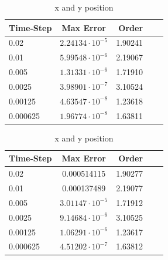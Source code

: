 \documentclass[12pt]{article}
\begin{document}
\begin{table}[bht]
\begin{center}
\begin{tabular}{|l|c|r|c|c|}
\hline
Time-Step& Max Error & Order \\ \hline
0.02&$2.24134\cdot10^{-5}$& 1.90241\\ \hline
0.01& $5.99548\cdot10^{-6}$& 2.19067 \\ \hline
0.005& $1.31331\cdot10^{-6}$& 1.71910\\ \hline
0.0025& $3.98901\cdot10^{-7}$& 3.10524 \\ \hline
0.00125&$4.63547\cdot10^{-8}$& 1.23618 \\ \hline
0.000625& $1.96774\cdot10^{-8}$& 1.63811 \\ \hline

\end{tabular}
\quad
\begin{tabular}{|l|c|r|c|c|}
\hline
Time-Step& Max Error & Order \\ \hline
0.02& 0.000514115& 1.90277 \\ \hline
0.01& 0.000137489& 2.19077 \\ \hline
0.005& $3.01147\cdot10^{-5}$& 1.71912 \\ \hline
0.0025&$9.14684\cdot10^{-6}$& 3.10525 \\ \hline
0.00125& $1.06291\cdot10^{-6}$& 1.23617 \\ \hline
0.000625& $4.51202\cdot10^{-7}$& 1.63812 \\ \hline

\end{tabular}
\caption{x and y position}
\end{center}
\end{table}
\end{document}
